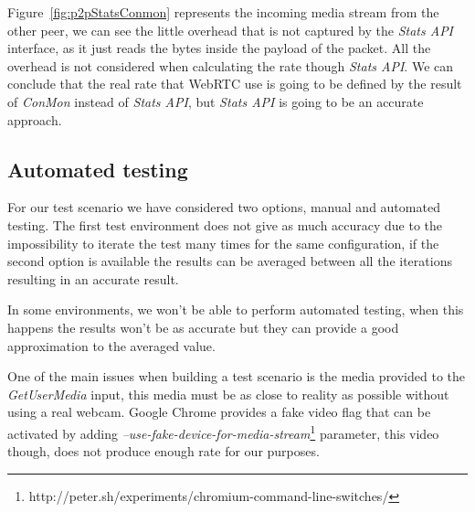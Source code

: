 Figure~\ref{fig:p2pStatsConmon} represents the incoming media stream from the other peer, we can see the little overhead that is not captured by the {\it Stats API} interface, as it just reads the bytes inside the payload of the packet. All the overhead is not considered when calculating the rate though {\it Stats API}. We can conclude that the real rate that WebRTC use is going to be defined by the result of {\it ConMon} instead of {\it Stats API}, but {\it Stats API} is going to be an accurate approach.

\subsection{Automated testing}

For our test scenario we have considered two options, manual and automated testing. The first test environment does not give as much accuracy due to the impossibility to iterate the test many times for the same configuration, if the second option is available the results can be averaged between all the iterations resulting in an accurate result.

In some environments, we won't be able to perform automated testing, when this happens the results won't be as accurate but they can provide a good approximation to the averaged value.

One of the main issues when building a test scenario is the media provided to the {\it GetUserMedia} input, this media must be as close to reality as possible without using a real webcam. Google Chrome provides a fake video flag that can be activated by adding {\it --use-fake-device-for-media-stream}\footnote{http://peter.sh/experiments/chromium-command-line-switches/} parameter, this video though, does not produce enough rate for our purposes.


